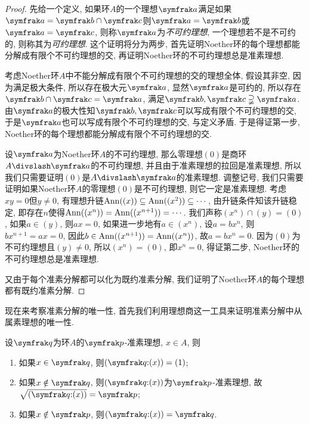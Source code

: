 \begin{proof}
  先给一个定义, 如果环$A$的一个理想$\ideal{a}$满足如果$\ideal{a}=\ideal{b}\cap\ideal{c}$则$\ideal{a}=\ideal{b}$或$\ideal{a}=\ideal{c}$, 则称$\ideal{a}$为\emph{不可约理想}, 一个理想若不是不可约的, 则称其为\emph{可约理想}. 这个证明将分为两步, 首先证明Noether环的每个理想都能分解成有限个不可约理想的交, 再证明Noether环的不可约理想总是准素理想.

  考虑Noether环$A$中不能分解成有限个不可约理想的交的理想全体, 假设其非空, 因为满足极大条件, 所以存在极大元$\ideal{a}$, 显然$\ideal{a}$是可约的, 所以存在$\ideal{b}\cap\ideal{c}=\ideal{a}$, 满足$\ideal{b}, \ideal{c}\supsetneqq\ideal{a}$. 由$\ideal{a}$的极大性知$\ideal{b}, \ideal{c}$可以写成有限个不可约理想的交, 于是$\ideal{a}$也可以写成有限个不可约理想的交, 与定义矛盾. 于是得证第一步, Noether环的每个理想都能分解成有限个不可约理想的交.

  设$\ideal{a}$为Noether环$A$的不可约理想, 那么零理想$(0)$是商环$A{\divslash}\ideal{a}$的不可约理想, 并且由于准素理想的拉回是准素理想, 所以我们只需要证明$(0)$是$A{\divslash}\ideal{a}$的准素理想. 调整记号, 我们只需要证明如果Noether环$A$的零理想$(0)$是不可约理想, 则它一定是准素理想. 考虑$xy=0$但$y\neq 0$, 有理想升链$\operatorname{Ann}((x))\subseteq\operatorname{Ann}((x^2))\subseteq\dotsb$, 由升链条件知该升链稳定, 即存在$n$使得$\operatorname{Ann}((x^n))=\operatorname{Ann}((x^{n+1}))=\dotsb$. 我们声称$(x^n)\cap (y)=(0)$, 如果$a\in (y)$, 则$ax=0$, 如果进一步地有$a\in (x^n)$, 设$a=bx^n$, 则$bx^{n+1}=ax=0$, 因此$b\in\operatorname{Ann}((x^{n+1}))=\operatorname{Ann}((x^n))$, 故$a=bx^n=0$. 因为$(0)$为不可约理想且$(y)\neq 0$, 所以$(x^n)=(0)$, 即$x^n=0$, 得证第二步, Noether环的不可约理想总是准素理想.

  又由于每个准素分解都可以化为既约准素分解, 我们证明了Noether环$A$的每个理想都有既约准素分解.
\end{proof}

现在来考察准素分解的唯一性, 首先我们利用理想商这一工具来证明准素分解中从属素理想的唯一性.

\begin{proposition}\label{prop:idealquotprimary}
  设$\ideal{q}$为环$A$的$\ideal{p}$-准素理想, $x\in A$, 则
  \begin{enumerate}
    \item 如果$x\in \ideal{q}$, 则$(\ideal{q}{:}(x))=(1)$;
    \item 如果$x\notin\ideal{q}$, 则$(\ideal{q}{:}(x))$为$\ideal{p}$-准素理想, 故$\sqrt{(\ideal{q}{:}(x))}=\ideal{p}$;
    \item 如果$x\notin\ideal{p}$, 则$(\ideal{q}{:}(x))=\ideal{q}$.
  \end{enumerate}
\end{proposition}

